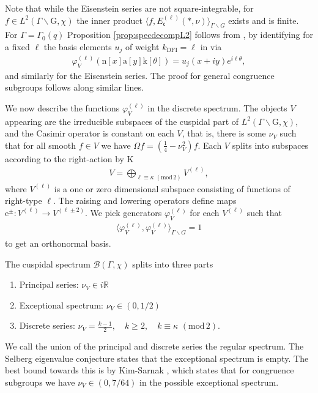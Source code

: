 \documentclass[12pt]{amsart}
\theoremstyle{definition}
\theoremstyle{remark}
\numberwithin{equation}{section}
\newcommand{\G}{\mathrm{G}}
\newcommand{\R}{{\mathbb R}}
\newcommand{\1}{{\mathbf 1}}
\renewcommand{\a}{\mathrm{a}}
\newcommand{\n}{\mathrm{n}}
\renewcommand{\k}{\mathrm{k}}
\renewcommand{\n}{\mathrm{n}}
\renewcommand{\pmod}[1]{\,\,(\mathrm{mod}\,{#1})}
\begin{document}
Note that while the Eisenstein series are not square-integrable, for $f \in L^{2}(\Gamma \backslash \G,\chi)$ the inner product  $\langle f, E^{(\ell)}_{\mathfrak{c}}(*,\nu) \rangle_{\Gamma \backslash G} $ exists and is finite.
For $\Gamma= \Gamma_0(q)$  Proposition \ref{prop:specdecompL2} follows from \cite[Section 4]{DFIartin}, by identifying for a fixed $\ell$ the basis elements $u_j$ of weight $k_{\text{DFI}}=\ell$ in  \cite[(4.50))]{DFIartin} via
\begin{align*}
  \varphi_V^{(\ell)}(\n[x] \a[y] \k[\theta])=  u_j(x+iy) e^{i\ell \theta},
\end{align*}
and similarly for the Eisenstein series.  The proof for general congruence subgroups follows along similar lines.


We now describe the functions $\varphi_V^{(\ell)}$ in the discrete spectrum. The objects $V$ appearing are the irreducible subspaces of the cuspidal part of $L^2(\Gamma\backslash \G,\chi)$, and the Casimir operator is constant on each $V$, that is, there is some $\nu_V$ such that for all smooth $f \in V$ we have $\Omega f = (\frac{1}{4}-\nu_V^2) f$. Each $V$ splits into subspaces according to the right-action by $\mathrm{K}$
\begin{align*}
    V = \bigoplus_{\ell \equiv \kappa \pmod{2}} V^{(\ell)},
\end{align*}
where $V^{(\ell)}$ is a one or zero dimensional subspace consisting of functions of right-type $\ell$. The raising and lowering operators define maps $\mathrm{e}^{\pm}: V^{(\ell)} \to  V^{(\ell \pm 2)}$. We pick generators $\varphi^{(\ell)}_V$ for each $V^{(\ell)}$ such that
\begin{align*}
    \langle \varphi^{(\ell)}_V, \varphi^{(\ell)}_V \rangle_{\Gamma \backslash G} =1
\end{align*}
to get an orthonormal basis.
 
The cuspidal spectrum $\mathcal{B}(\Gamma,\chi)$ splits into three parts
\begin{enumerate}
    \item Principal series: $\nu_V \in i \R$
    \item Exceptional spectrum: $\nu_V \in (0,1/2)$
    \item Discrete series: $\nu_V =  \frac{k-1}{2}, \quad k \geq 2, \quad k \equiv \kappa \pmod{2}$.
    \end{enumerate}
We call the union of the principal and discrete series the regular spectrum. 
 The Selberg eigenvalue conjecture states that the exceptional spectrum is empty. The best bound towards this is by Kim-Sarnak \cite{KimSarnak}, which states that for congruence subgroups we have $\nu_V \in (0,7/64)$ in the possible exceptional spectrum. 
 
\end{document}
